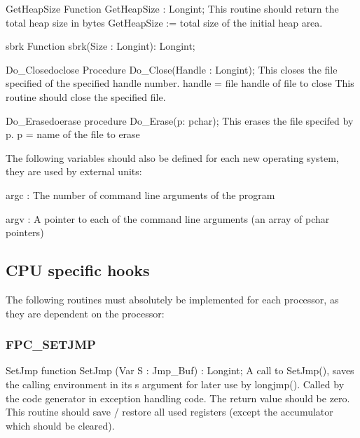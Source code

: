 \documentclass [12pt]{article}
\begin{document}
\begin{function}{GetHeapSize}
\Declaration
Function GetHeapSize : Longint;
\Description 
This routine should return the total heap size in bytes 
\Parameters 
\Algorithm
GetHeapSize := total size of the initial heap area.
\end{function}

\begin{function}{sbrk}
\Declaration
Function sbrk(Size : Longint): Longint;
\Description 
\end{function}

\begin{procedurel}{Do{\_}Close}{doclose}
\Declaration
Procedure Do{\_}Close(Handle : Longint);
\Description 
This closes the file specified of the specified handle number. 
\Parameters 
handle = file handle of file to close 
\Notes 
This routine should close the specified file. 
\end{procedurel}

\begin{functionl}{Do{\_}Erase}{doerase}
\Declaration
procedure Do{\_}Erase(p: pchar);
\Description 
This erases the file specifed by p. 
\Parameters 
p = name of the file to erase 
\Notes 
\end{functionl}

The following variables should also be defined for each new operating 
system, they are used by external units:

\noindent
argc : The number of command line arguments of the program

\noindent
argv : A pointer to each of the command line arguments (an array of pchar 
pointers)

\subsection{CPU specific hooks}
\label{subsec:mylabel9}

The following routines must absolutely be implemented for each processor, as
they are dependent on the processor:

\subsubsection{FPC{\_}SETJMP}
\label{subsubsec:mylabel30}

\begin{function}{SetJmp}
\Declaration
function SetJmp (Var S : Jmp{\_}Buf) : Longint;
\Description 
A call to SetJmp(), saves the calling environment in its \textsf{s} argument
for later use by \textsf{longjmp()}. Called by the code generator in
exception handling code. The return value should be zero.
\Notes 
This routine should save / restore all used registers (except the
accumulator which should be cleared).
\end{function}
\end{document}
